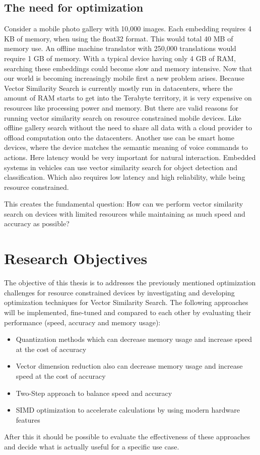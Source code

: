 \subsection{The need for optimization}
Consider a mobile photo gallery with 10,000 images. Each embedding requires 4 KB of memory, when using the float32 format. This would total 40 MB of memory use. An offline machine translator with 250,000 translations would require 1 GB of memory. With a typical device having only 4 GB of RAM, searching these embeddings could become slow and memory intensive.
Now that our world is becoming increasingly mobile first a new problem arises.
Because Vector Similarity Search is currently mostly run in datacenters, where the amount of RAM starts to get into the Terabyte territory, it is very expensive on resources like processing power and memory.
But there are valid reasons for running vector similarity search on resource constrained mobile devices.
Like offline gallery search without the need to share all data with a cloud provider to offload computation onto the datacenters. Another use can be smart home devices, where the device matches the semantic meaning of voice commands to actions. Here latency would be very important for natural interaction.
Embedded systems in vehicles can use vector similarity search for object detection and classification. Which also requires low latency and high reliability, while being resource constrained.

This creates the fundamental question: How can we perform vector similarity search on devices with limited resources while maintaining as much speed and accuracy as possible?

\section{Research Objectives}
The objective of this thesis is to addresses the previously mentioned optimization challenges for resource constrained devices by investigating and developing optimization techniques for Vector Similarity Search.
The following approaches will be implemented, fine-tuned and compared to each other by evaluating their performance (speed, accuracy and memory usage):

\begin{itemize}
    \item Quantization methods which can decrease memory usage and increase speed at the cost of accuracy
    \item Vector dimension reduction also can decrease memory usage and increase speed at the cost of accuracy
    \item Two-Step approach to balance speed and accuracy
    \item SIMD optimization to accelerate calculations by using modern hardware features
\end{itemize}
After this it should be possible to evaluate the effectiveness of these approaches and decide what is actually useful for a specific use case.

